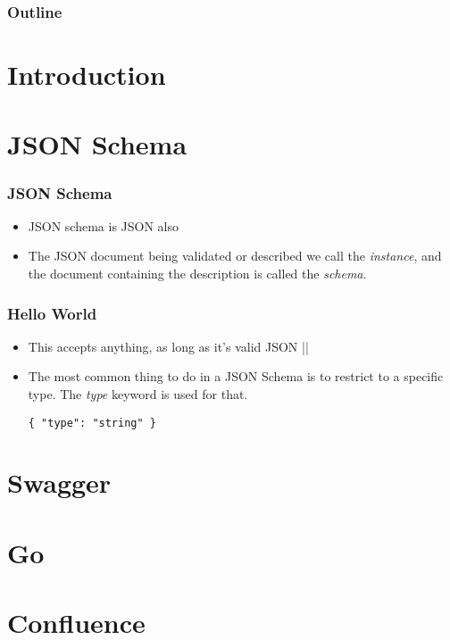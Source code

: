 \documentclass{efd-lecture}
\begin{document}
\begin{frame}
  \titlepage{}
\end{frame}
\begin{frame}
  \frametitle{Outline}
  \tableofcontents{}
\end{frame}

\section{Introduction}

\section{JSON Schema}

\begin{frame}
  \frametitle{JSON Schema}
  \begin{itemize}
    \item JSON schema is JSON also
    \item The JSON document being validated or described we call the
      \textit{\color{YellowOrange} instance}, and the document containing the
      description is called the \textit{\color{GreenYellow} schema}.
  \end{itemize}
\end{frame}

\begin{frame}[fragile]
  \frametitle{Hello World}
  \begin{itemize}
    \item This accepts anything, as long as it’s valid JSON
      |{}|
    \item The most common thing to do in a JSON Schema is to restrict to a specific type. The \textit{\color{YellowOrange} type} keyword is used for that.
    \begin{verbatim}
{ "type": "string" }
    \end{verbatim}
  \end{itemize}
\end{frame}

\section{Swagger}

\section{Go}

\section{Confluence}
\end{document}

